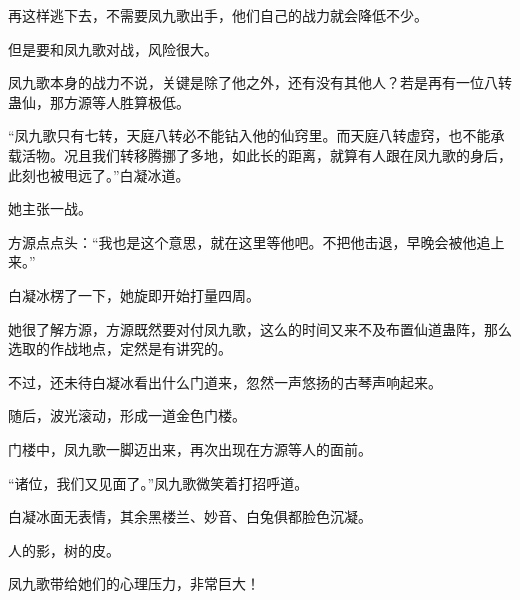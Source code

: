 \begin{this_body}
再这样逃下去，不需要凤九歌出手，他们自己的战力就会降低不少。

但是要和凤九歌对战，风险很大。

凤九歌本身的战力不说，关键是除了他之外，还有没有其他人？若是再有一位八转蛊仙，那方源等人胜算极低。

“凤九歌只有七转，天庭八转必不能钻入他的仙窍里。而天庭八转虚窍，也不能承载活物。况且我们转移腾挪了多地，如此长的距离，就算有人跟在凤九歌的身后，此刻也被甩远了。”白凝冰道。

她主张一战。

方源点点头：“我也是这个意思，就在这里等他吧。不把他击退，早晚会被他追上来。”

白凝冰楞了一下，她旋即开始打量四周。

她很了解方源，方源既然要对付凤九歌，这么的时间又来不及布置仙道蛊阵，那么选取的作战地点，定然是有讲究的。

不过，还未待白凝冰看出什么门道来，忽然一声悠扬的古琴声响起来。

随后，波光滚动，形成一道金色门楼。

门楼中，凤九歌一脚迈出来，再次出现在方源等人的面前。

“诸位，我们又见面了。”凤九歌微笑着打招呼道。

白凝冰面无表情，其余黑楼兰、妙音、白兔俱都脸色沉凝。

人的影，树的皮。

凤九歌带给她们的心理压力，非常巨大！

\end{this_body}

